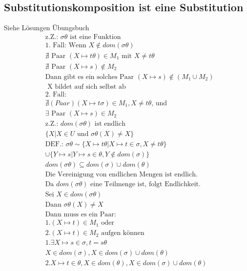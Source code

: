 \subsection{Substitutionskomposition ist eine Substitution}
Siehe Lösungen Übungsbuch
\begin{align*}
&\text{z.Z.: } \sigma\theta \text{ ist eine Funktion} \\
&\text{1. Fall: Wenn } X\notin dom(\sigma\theta) \\
&\nexists \text{ Paar } (X\mapsto t\theta ) \in M_1 \text{ mit } X \ne t\theta \\
&\nexists \text{ Paar } (X\mapsto s) \notin M_2 \\
&\text{Dann gibt es ein solches Paar } (X\mapsto s) \notin (M_1 \cup M_2)\\
&\text{ X bildet auf sich selbst ab } \\
&\text{2. Fall: } \\
&\nexists ( Paar ) (X\mapsto t\sigma)\in M_1 , X\ne t\theta \text{, und } \\
&\exists \text{ Paar } (X\mapsto s)\in M_2 \\
& \text{z.Z.: } dom(\sigma\theta) \text{ ist endlich } \\
& \{X|X\in U \text{ und } \sigma\theta (X) \ne X\} \\
& \text{DEF.: }\sigma\theta \sim \{X\mapsto t\theta | X \mapsto t\in \sigma, X \ne t\theta \} \\
& \cup \{ Y \mapsto s | Y \mapsto s \in \theta, Y \notin dom(\sigma) \} \\
& dom(\sigma\theta) \subseteq dom(\sigma ) \cup dom(\theta) \\
&\text{Die Vereinigung von endlichen Mengen ist endlich. } \\ 
&\text{Da } dom(\sigma\theta) \text{ eine Teilmenge ist, folgt Endlichkeit. } \\
&\text{Sei } X\in dom(\sigma\theta)\\
&\text{Dann } \sigma\theta (X) \ne X \\
&\text{Dann muss es ein Paar: }\\
& 1. (X\mapsto t)\in M_{1} \text{ oder }\\
& 2. (X\mapsto t)\in M_{2} \text{ aufgen können}\\
& 1. \exists X\mapsto s \in \sigma , t = s\theta\\
& X \in dom(\sigma), X \in dom(\sigma)\cup dom(\theta) \\
& 2. X\mapsto t \in \theta, X \in dom(\theta), X\in dom(\sigma) \cup dom(\theta)
\end{align*}
